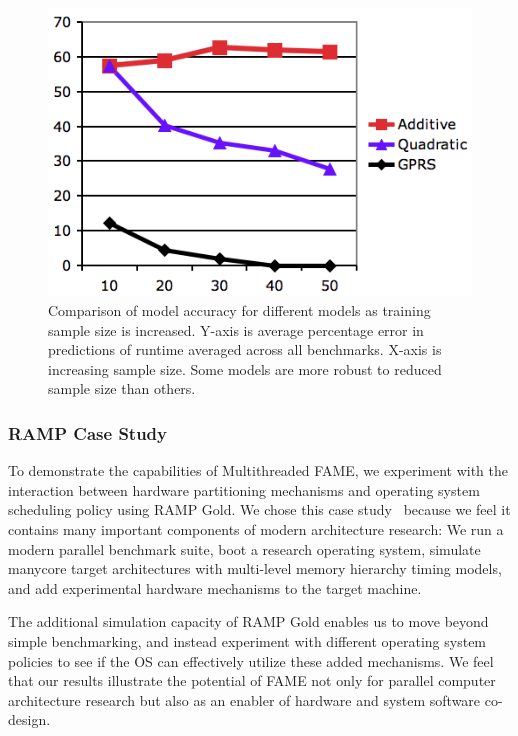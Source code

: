 \begin{figure}
	\centering
	\includegraphics[scale = 0.5] {Figures/acc_sample.png}
	\caption{ \small Comparison of model accuracy for different models as training sample size is increased.  Y-axis is average percentage error in predictions of runtime averaged across all benchmarks. X-axis is increasing sample size.  Some models are more robust to reduced sample size than others.}
	\label{fig:acc-sample}
\end{figure}


\subsubsection*{RAMP Case Study}

To demonstrate the capabilities of Multithreaded FAME, we experiment
with the interaction between hardware partitioning mechanisms and
operating system scheduling policy using RAMP Gold.  We chose this
case study~\cite{bird,tess_resource} because we feel it contains many important
components of modern architecture research:  We run a modern
parallel benchmark suite, boot a research operating system, simulate
manycore target architectures with multi-level memory hierarchy timing
models, and add experimental hardware mechanisms to the target
machine.

The additional simulation capacity of RAMP Gold enables us to move
beyond simple benchmarking, and instead experiment with different
operating system policies to see if the OS can effectively utilize
these added mechanisms.  We feel that our results illustrate the
potential of FAME not only for parallel computer architecture research
but also as an enabler of hardware and system software co-design.

